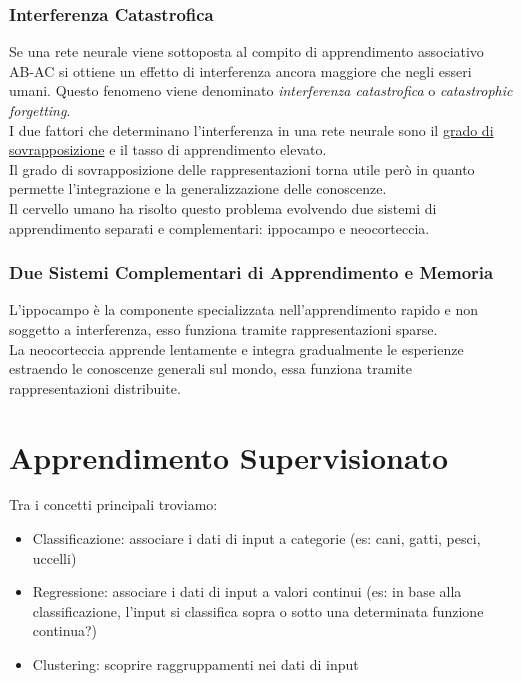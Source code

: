 \documentclass[12pt, a4paper]{article}
\begin{document}
\subsubsection{Interferenza Catastrofica}
Se una rete neurale viene sottoposta al compito di apprendimento associativo AB-AC si ottiene un effetto di interferenza ancora maggiore che negli esseri umani. Questo fenomeno viene denominato \textit{interferenza catastrofica} o \textit{catastrophic forgetting}.\\
I due fattori che determinano l'interferenza in una rete neurale sono il \href{https://www.sciencedirect.com/science/article/abs/pii/S1364661316300432}{grado di sovrapposizione} e il tasso di apprendimento elevato.\\
Il grado di sovrapposizione delle rappresentazioni torna utile però in quanto permette l'integrazione e la generalizzazione delle conoscenze.\\
Il cervello umano ha risolto questo problema evolvendo due sistemi di apprendimento separati e complementari: ippocampo e neocorteccia.

\subsubsection{Due Sistemi Complementari di Apprendimento e Memoria}
L'ippocampo è la componente specializzata nell'apprendimento rapido e non soggetto a interferenza, esso funziona tramite rappresentazioni sparse.\\
La neocorteccia apprende lentamente e integra gradualmente le esperienze estraendo le conoscenze generali sul mondo, essa funziona tramite rappresentazioni distribuite.

\newpage
\section{Apprendimento Supervisionato}
Tra i concetti principali troviamo:
\begin{itemize}
    \item Classificazione: associare i dati di input a categorie (es: cani, gatti, pesci, uccelli)
    \item Regressione: associare i dati di input a valori continui (es: in base alla classificazione, l'input si classifica sopra o sotto una determinata funzione continua?)
    \item Clustering: scoprire raggruppamenti nei dati di input
\end{itemize}
\end{document}
